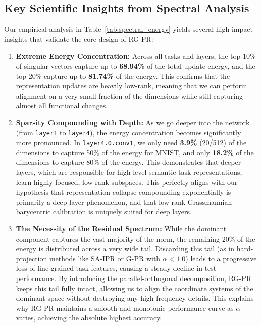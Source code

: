 \documentclass{article}
\theoremstyle{plain}
\theoremstyle{definition}
\theoremstyle{remark}
\begin{document}
\subsection{Key Scientific Insights from Spectral Analysis}
\label{app:spectral_insights}

Our empirical analysis in Table~\ref{tab:spectral_energy} yields several high-impact insights that validate the core design of RG-PR:
\begin{enumerate}
    \item \textbf{Extreme Energy Concentration:} Across all tasks and layers, the top 10\% of singular vectors capture up to \textbf{68.94\%} of the total update energy, and the top 20\% capture up to \textbf{81.74\%} of the energy. This confirms that the representation updates are heavily low-rank, meaning that we can perform alignment on a very small fraction of the dimensions while still capturing almost all functional changes.
    \item \textbf{Sparsity Compounding with Depth:} As we go deeper into the network (from \texttt{layer1} to \texttt{layer4}), the energy concentration becomes significantly more pronounced. In \texttt{layer4.0.conv1}, we only need \textbf{3.9\%} (20/512) of the dimensions to capture 50\% of the energy for MNIST, and only \textbf{18.2\%} of the dimensions to capture 80\% of the energy. This demonstrates that deeper layers, which are responsible for high-level semantic task representations, learn highly focused, low-rank subspaces. This perfectly aligns with our hypothesis that representation collapse compounding exponentially is primarily a deep-layer phenomenon, and that low-rank Grassmannian barycentric calibration is uniquely suited for deep layers.
    \item \textbf{The Necessity of the Residual Spectrum:} While the dominant component captures the vast majority of the norm, the remaining 20\% of the energy is distributed across a very wide tail. Discarding this tail (as in hard-projection methods like SA-IPR or G-PR with $\alpha < 1.0$) leads to a progressive loss of fine-grained task features, causing a steady decline in test performance. By introducing the parallel-orthogonal decomposition, RG-PR keeps this tail fully intact, allowing us to align the coordinate systems of the dominant space without destroying any high-frequency details. This explains why RG-PR maintains a smooth and monotonic performance curve as $\alpha$ varies, achieving the absolute highest accuracy.
\end{enumerate}
\end{document}
